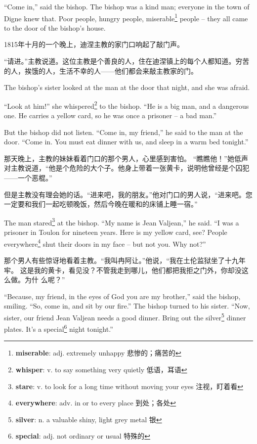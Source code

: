\documentclass[fontset=ubuntu, zihao=5]{ctexart}
\begin{document}
\begin{paracol}{2}
  ``Come in,'' said the bishop. The bishop was a kind man; everyone in the town of Digne knew that. Poor people, hungry people, miserable\footnote{\textbf{miserable}: adj. extremely unhappy 悲惨的；痛苦的} people – they all came to the door of the bishop's house.

  \switchcolumn

  \sectionbreak

  1815年十月的一个晚上，迪涅主教的家门口响起了敲门声。

  “请进。”主教说道。这位主教是个善良的人，住在迪涅镇上的每个人都知道。穷苦
  的人，挨饿的人，生活不幸的人——他们都会来敲主教家的门。

  \switchcolumn*

  The bishop's sister looked at the man at the door that night, and she was afraid.

  ``Look at him!'' she whispered\footnote{\textbf{whisper}: v. to say something very quietly 低语，耳语} to the bishop. ``He is a big man, and a dangerous one. He carries a yellow card, so he was once a prisoner – a bad man.''

  But the bishop did not listen. ``Come in, my friend,'' he said to the man at the door. ``Come in. You must eat dinner with us, and sleep in a warm bed tonight.''

  \switchcolumn

  那天晚上，主教的妹妹看着门口的那个男人，心里感到害怕。
  “瞧瞧他！”她低声对主教说道，“他是个危险的大个子。他身上带着一张黄卡，说明他曾经是个囚犯——一个恶棍。”


  但是主教没有理会她的话。“进来吧，我的朋友。”他对门口的男人说，“进来吧。您一定要和我们一起吃顿晚饭，然后今晚在暖和的床铺上睡一宿。”

  \switchcolumn*

  The man stared\footnote{\textbf{stare}: v. to look for a long time without moving your eyes 注视，盯着看} at the bishop. ``My name is Jean Valjean,'' he said. ``I was a prisoner in Toulon for nineteen years. Here is my yellow card, see? People everywhere\footnote{\textbf{everywhere}: adv. in or to every place 到处；各处} shut their doors in my face – but not you. Why not?''

  \switchcolumn

  那个男人有些惊讶地看着主教。“我叫冉阿让。”他说，“我在土伦监狱坐了十九年牢。
  这是我的黄卡，看见没？不管我走到哪儿，他们都把我拒之门外，你却没这么做。为什
  么呢？”

  \switchcolumn*

  ``Because, my friend, in the eyes of God you are my brother,'' said the
  bishop, smiling. ``So, come in, and sit by our fire.'' The bishop turned to
  his sister. ``Now, sister, our friend Jean Valjean needs a good dinner. Bring
  out the silver\footnote{\textbf{silver}: n. a valuable shiny, light grey
    metal 银} dinner plates. It's a special\footnote{\textbf{special}: adj. not ordinary or usual 特殊的} night tonight.''


\end{paracol}
\end{document}
